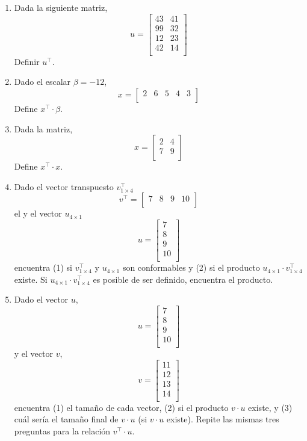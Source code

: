 \documentclass[10pt]{article}
\begin{document}
\begin{enumerate}
\item Dada la siguiente matriz,
\[u=
\begin{bmatrix}
43 & 41\\
99 & 32\\ 
12 & 23\\ 
42 & 14\\ 
\end{bmatrix}
\] Definir $u^{\top}$.
\item Dado el escalar $\beta=-12$,
\[x=
\begin{bmatrix}
2 & 6 & 5 & 4 & 3\\
\end{bmatrix}
\] Define $x^{\top}\cdot\beta$.
\item Dada la matriz,
\[x=
\begin{bmatrix}
2 & 4\\
7 & 9\\ 
\end{bmatrix}
\] Define $x^{\top}\cdot{x}$.
\item Dado el vector transpuesto $v^{\top}_{1\times 4}$
\[v^{\top}=
\begin{bmatrix}
7 & 8 & 9 & 10\\ 
\end{bmatrix}
\] el y el vector $u_{4\times 1}$
\[u=
\begin{bmatrix}
7 \\
8 \\
9 \\
10\\ 
\end{bmatrix}
\]
encuentra (1) si $v^{\top}_{1\times 4}$ y $u_{4\times 1}$ son conformables y (2) si el producto $u_{4\times 1} \cdot v^{\top}_{1\times 4}$ existe. Si $u_{4\times 1} \cdot v^{\top}_{1\times 4}$ es posible de ser definido, encuentra el producto.

\item Dado el vector $u$,
\[u=
\begin{bmatrix}
7 \\
8 \\
9 \\
10\\ 
\end{bmatrix}
\] y el vector $v$,
\[v=
\begin{bmatrix}
11\\
12 \\
13 \\
14\\ 
\end{bmatrix}
\]
encuentra (1) el tama\~no de cada vector, (2) si el producto $v\cdot u$ existe, y (3) cu\'al ser\'ia el tama\~no final de $v\cdot u$ (si $v\cdot u$ existe). Repite las mismas tres preguntas para la relaci\'on $v^{\top}\cdot u$.


\end{enumerate}
\end{document}

